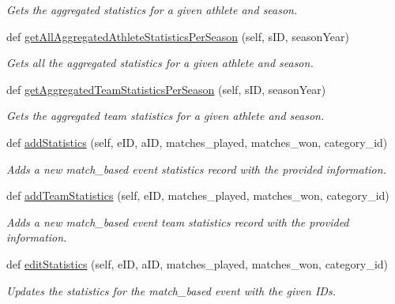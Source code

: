 \begin{DoxyCompactItemize}
\begin{DoxyCompactList}\small\item\em Gets the aggregated statistics for a given athlete and season. \end{DoxyCompactList}\item 
def \hyperlink{classhandler_1_1dao_1_1match__based__event__dao_1_1_match_based_event_d_a_o_a0ffef87d28ae72c4064417cdf73ce7b0}{get\+All\+Aggregated\+Athlete\+Statistics\+Per\+Season} (self, s\+ID, season\+Year)
\begin{DoxyCompactList}\small\item\em Gets all the aggregated statistics for a given athlete and season. \end{DoxyCompactList}\item 
def \hyperlink{classhandler_1_1dao_1_1match__based__event__dao_1_1_match_based_event_d_a_o_a06abc4420c9f0176e1e61fd914758c70}{get\+Aggregated\+Team\+Statistics\+Per\+Season} (self, s\+ID, season\+Year)
\begin{DoxyCompactList}\small\item\em Gets the aggregated team statistics for a given athlete and season. \end{DoxyCompactList}\item 
def \hyperlink{classhandler_1_1dao_1_1match__based__event__dao_1_1_match_based_event_d_a_o_a44e2ec5ef7ecf91f5a88bb2b87ae9012}{add\+Statistics} (self, e\+ID, a\+ID, matches\+\_\+played, matches\+\_\+won, category\+\_\+id)
\begin{DoxyCompactList}\small\item\em Adds a new match\+\_\+based event statistics record with the provided information. \end{DoxyCompactList}\item 
def \hyperlink{classhandler_1_1dao_1_1match__based__event__dao_1_1_match_based_event_d_a_o_ab91b1626311211f01811fdbf022e8ea1}{add\+Team\+Statistics} (self, e\+ID, matches\+\_\+played, matches\+\_\+won, category\+\_\+id)
\begin{DoxyCompactList}\small\item\em Adds a new match\+\_\+based event team statistics record with the provided information. \end{DoxyCompactList}\item 
def \hyperlink{classhandler_1_1dao_1_1match__based__event__dao_1_1_match_based_event_d_a_o_a8441b8e45492a1532737215b1357484a}{edit\+Statistics} (self, e\+ID, a\+ID, matches\+\_\+played, matches\+\_\+won, category\+\_\+id)
\begin{DoxyCompactList}\small\item\em Updates the statistics for the match\+\_\+based event with the given I\+Ds. \end{DoxyCompactList}\item 

\end{DoxyCompactItemize}

